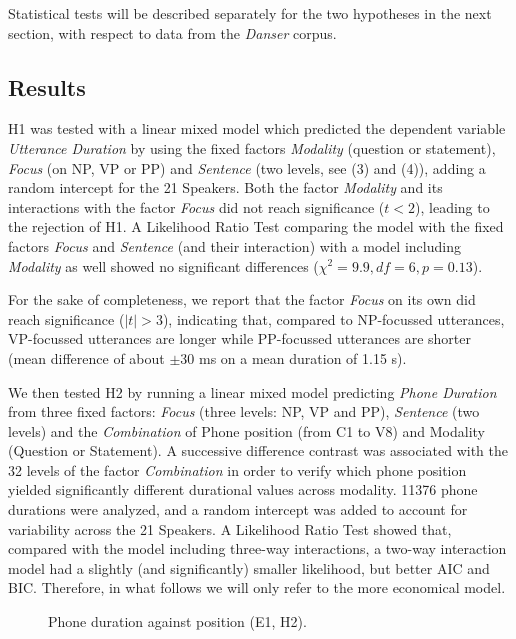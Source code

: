Statistical tests will be described separately for the two hypotheses in the next section, with respect to data from the \textit{Danser} corpus.

\subsection{Results}\label{sec433}

H1 was tested with a linear mixed model which predicted the dependent variable \textit{Utterance Duration} by using the fixed factors \textit{Modality} (question or statement), \textit{Focus} (on NP, VP or PP) and \textit{Sentence} (two levels, see (3) and (4)), adding a random intercept for the 21 Speakers. Both the factor \textit{Modality} and its interactions with the factor \textit{Focus} did not reach significance ($t<2$), leading to the rejection of H1. A Likelihood Ratio Test comparing the model with the fixed factors \textit{Focus} and \textit{Sentence} (and their interaction) with a model including \textit{Modality} as well showed no significant differences ($\chi^{2}=9.9, df=6, p=0.13$). 

For the sake of completeness, we report that the factor \textit{Focus} on its own did reach significance ($|t|>3$), indicating that, compared to NP-focussed utterances, VP-focussed utterances are longer while PP-focussed utterances are shorter (mean difference of about $\pm$30 ms on a mean duration of 1.15 s).

We then tested H2 by running a linear mixed model predicting \textit{Phone Duration} from three fixed factors: \textit{Focus} (three levels: NP, VP and PP), \textit{Sentence} (two levels) and the \textit{Combination} of Phone position (from C1 to V8) and Modality (Question or Statement).  A successive difference contrast was associated with the 32 levels of the factor \textit{Combination} in order to verify which phone position yielded significantly different durational values across modality. 11376 phone durations were analyzed, and a random intercept was added to account for variability across the 21 Speakers. A Likelihood Ratio Test showed that, compared with the model including three-way interactions, a two-way interaction model had a slightly (and significantly) smaller likelihood, but better AIC and BIC. Therefore, in what follows we will only refer to the more economical model. 

\begin{figure}
\centering
{}
\caption{Phone duration against position (E1, H2).}
\label{fig402}\end{figure}

